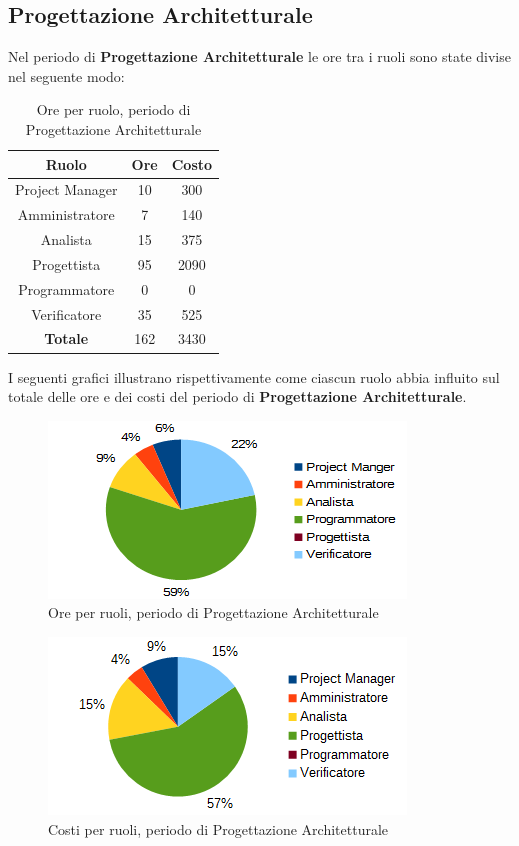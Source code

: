 	\subsection{Progettazione Architetturale}
	Nel periodo di \textbf{Progettazione Architetturale} le ore tra i ruoli sono state divise nel seguente modo: \\
	\begin{table}[H]
		\centering
		\begin{tabular}{|c|c|c|}
			\hline
			\textbf{Ruolo}		& \textbf{Ore}	& \textbf{Costo} \\
			\hline
			Project Manager		& 10			& 300	\\
			Amministratore		& 7				& 140	\\
			Analista			& 15			& 375	\\
			Progettista			& 95			& 2090	\\
			Programmatore		& 0				& 0	\\
			Verificatore		& 35			& 525	\\
			\hline
			\textbf{Totale}		& 162			& 3430	\\
			\hline
		\end{tabular}
		\caption{Ore per ruolo, periodo di Progettazione Architetturale}
		\end{table}
	I seguenti grafici illustrano rispettivamente come ciascun ruolo abbia influito sul totale
delle ore e dei costi del periodo di \textbf{Progettazione Architetturale}. \\
	\begin{figure}[H]
		\centering
		\includegraphics[scale=1]{immagini/grafici/progettazione_architetturale-torta.png}
		\caption{Ore per ruoli, periodo di Progettazione Architetturale}
	\end{figure}
	\begin{figure}[H]
		\centering
		\includegraphics[scale=1]{immagini/grafici/progettazione_architetturale-torta-costo.png}
		\caption{Costi per ruoli, periodo di Progettazione Architetturale}
	\end{figure}
